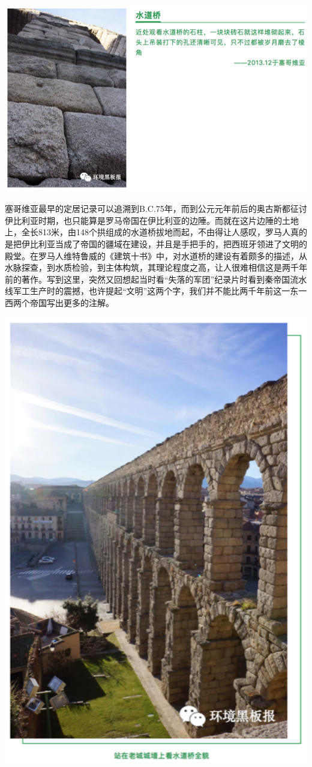 \documentclass[]{book}
\begin{document}
\includegraphics[width=8.33in]{images/xt47}

塞哥维亚最早的定居记录可以追溯到B.C.75年，而到公元元年前后的奥古斯都征讨伊比利亚时期，也只能算是罗马帝国在伊比利亚的边陲。而就在这片边陲的土地上，全长813米，由148个拱组成的水道桥拔地而起，不由得让人感叹，罗马人真的是把伊比利亚当成了帝国的疆域在建设，并且是手把手的，把西班牙领进了文明的殿堂。在罗马人维特鲁威的《建筑十书》中，对水道桥的建设有着颇多的描述，从水脉探查，到水质检验，到主体构筑，其理论程度之高，让人很难相信这是两千年前的著作。写到这里，突然又回想起当时看``失落的军团''纪录片时看到秦帝国流水线军工生产时的震撼，也许提起``文明''这两个字，我们并不能比两千年前这一东一西两个帝国写出更多的注解。

\includegraphics[width=5.67in]{images/xt48}
\end{document}
